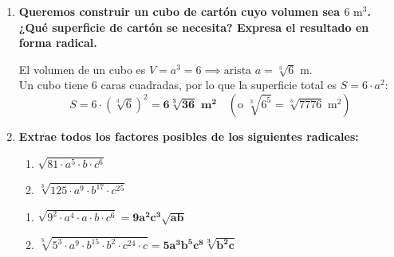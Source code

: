 \documentclass[a4paper,12pt]{article}
\begin{document}
\begin{enumerate}
    \item \textbf{Queremos construir un cubo de cartón cuyo volumen sea $6\text{ m}^{3}$. ¿Qué superficie de cartón se necesita? Expresa el resultado en forma radical.}
        \begin{solucion}
            El volumen de un cubo es $V = a^{3} = 6 \implies \text{arista } a = \sqrt[3]{6}\text{ m}$. \\
            Un cubo tiene 6 caras cuadradas, por lo que la superficie total es $S = 6 \cdot a^{2}$:
            $$S = 6 \cdot (\sqrt[3]{6})^{2} = \mathbf{6\sqrt[3]{36}\text{ m}^{2}} \quad (\text{o } \sqrt[3]{6^{5}} = \sqrt[3]{7776}\text{ m}^{2})$$
        \end{solucion}

    \item \textbf{Extrae todos los factores posibles de los siguientes radicales:}
        \begin{enumerate}[label=\alph*)]
            \item $\sqrt{81 \cdot a^{5} \cdot b \cdot c^{6}}$
            \item $\sqrt[3]{125 \cdot a^{9} \cdot b^{17} \cdot c^{25}}$
        \end{enumerate}
        \begin{solucion}
            \begin{enumerate}[label=\alph*)]
                \item $\sqrt{9^{2} \cdot a^{4} \cdot a \cdot b \cdot c^{6}} = \mathbf{9 a^{2} c^{3} \sqrt{ab}}$
                \item $\sqrt[3]{5^{3} \cdot a^{9} \cdot b^{15} \cdot b^{2} \cdot c^{24} \cdot c} = \mathbf{5 a^{3} b^{5} c^{8} \sqrt[3]{b^{2}c}}$
            \end{enumerate}
        \end{solucion}


\end{enumerate}
\end{document}

